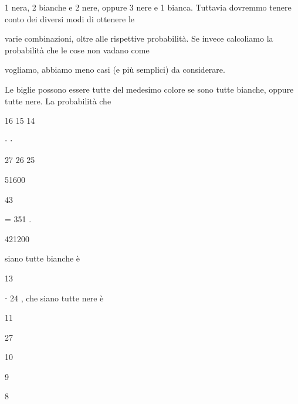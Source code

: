 \documentclass[a4paper,portrait,12pt]{article}
\begin{document}
\begin{flushleft}
1 nera, 2 bianche e 2 nere, oppure 3 nere e 1 bianca. Tuttavia dovremmo tenere conto dei diversi modi di ottenere le
\end{flushleft}


\begin{flushleft}
varie combinazioni, oltre alle rispettive probabilit\`{a}. Se invece calcoliamo la probabilit\`{a} che le cose non vadano come
\end{flushleft}


\begin{flushleft}
vogliamo, abbiamo meno casi (e più semplici) da considerare.
\end{flushleft}


\begin{flushleft}
Le biglie possono essere tutte del medesimo colore se sono tutte bianche, oppure tutte nere. La probabilit\`{a} che
\end{flushleft}


16 15 14


⋅ ⋅


27 26 25


51600


43


= 351 .


421200





\begin{flushleft}
siano tutte bianche \`{e}
\end{flushleft}





13





\begin{flushleft}
⋅ 24 , che siano tutte nere \`{e}
\end{flushleft}





11


27





10





9





8
\end{document}

